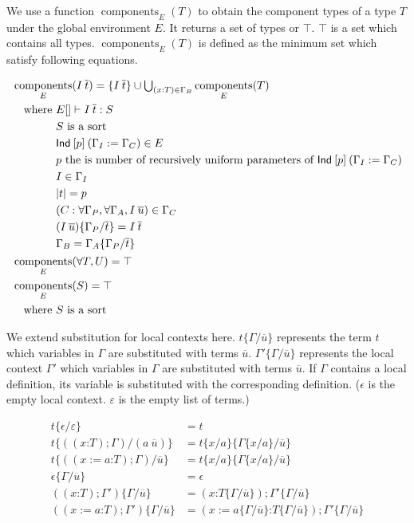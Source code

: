 \documentclass[a4paper,fleqn]{article}
\newcommand{\lassum}[2]{(#1\mathord{:}#2)}
\newcommand{\ldef}[3]{(#1:=#2\mathord{:}#3)}
\newcommand{\tbigcup}{{\textstyle\bigcup}}
\DeclareMathOperator{\components}{components}
\newcommand{\subst}[3]{#1\{#2/#3\}}
\newcommand{\rep}[1]{\overline{#1}}
\begin{document}
We use a function $\components_E(T)$ to obtain the component types of a type $T$ under the global environment $E$.
It returns a set of types or $\top$.
$\top$ is a set which contains all types.
$\components_E(T)$ is defined as the minimum set which satisfy following equations.

\begin{align*}
  & \components_E(I\:\rep{t}) = \{I\:\rep{t}\} \cup \tbigcup_{(x{}:T) \in \Gamma_B} \components_E(T) \\
  & \begin{aligned}
    \quad \text{where}~
    & E[] \vdash I\:\rep{t} : S \\
    & \text{$S$ is a sort} \\
    & \text{\sf Ind}\:[p]\:(\Gamma_I := \Gamma_C) \in E \\
    & \text{$p$ the is number of recursively uniform parameters of $\text{\sf Ind}\:[p]\:(\Gamma_I := \Gamma_C)$} \\
    & I \in \Gamma_I \\
    & |t| = p \\
    & (C:\forall \Gamma_P, \forall \Gamma_A, I\:\rep{u}) \in \Gamma_C \\
    & \subst{(I\:\rep{u})}{\Gamma_P}{\rep{t}} = I\:\rep{t} \\
    & \Gamma_B = \subst{\Gamma_A}{\Gamma_P}{\rep{t}}
    \end{aligned} \\
  & \components_E(\forall T, U) = \top \\
  & \components_E(S) = \top \\
  & \quad \text{where}~ \text{$S$ is a sort} \\
\end{align*}

We extend substitution for local contexts here.
$\subst{t}{\Gamma}{\rep{u}}$ represents the term $t$ which variables in $\Gamma$ are substituted with terms $\rep{u}$.
$\subst{\Gamma'}{\Gamma}{\rep{u}}$ represents the local context $\Gamma'$ which variables in $\Gamma$ are substituted with terms $\rep{u}$.
If $\Gamma$ contains a local definition, its variable is substituted with the corresponding definition.
($\epsilon$ is the empty local context. $\varepsilon$ is the empty list of terms.)

\begin{align*}
  \subst{t}{\epsilon}{\varepsilon} &= t \\
  \subst{t}{(\lassum{x}{T};\Gamma)}{(a\:\rep{u})} &= \subst{\subst{t}{x}{a}}{\subst{\Gamma}{x}{a}}{\rep{u}} \\
  \subst{t}{(\ldef{x}{a}{T};\Gamma)}{\rep{u}} &= \subst{\subst{t}{x}{a}}{\subst{\Gamma}{x}{a}}{\rep{u}} \\
  \subst{\epsilon}{\Gamma}{\rep{u}} &= \epsilon \\
  \subst{(\lassum{x}{T};\Gamma')}{\Gamma}{\rep{u}} &= \lassum{x}{\subst{T}{\Gamma}{\rep{u}}};\subst{\Gamma'}{\Gamma}{\rep{u}} \\
  \subst{(\ldef{x}{a}{T};\Gamma')}{\Gamma}{\rep{u}} &= \ldef{x}{\subst{a}{\Gamma}{\rep{u}}}{\subst{T}{\Gamma}{\rep{u}}};\subst{\Gamma'}{\Gamma}{\rep{u}}
\end{align*}
\end{document}
